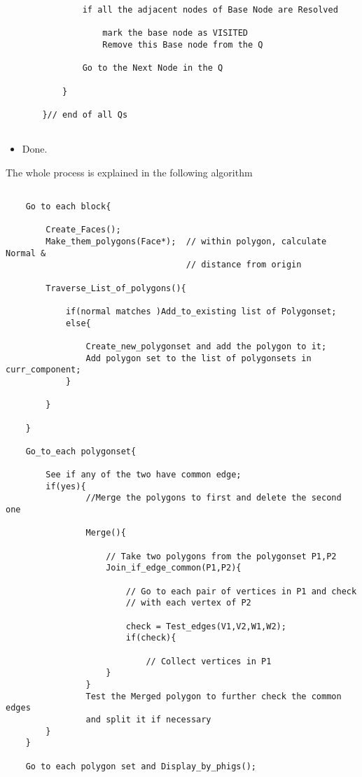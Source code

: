 \begin{itemize}
\begin{verbatim}
            if all the adjacent nodes of Base Node are Resolved
 
                mark the base node as VISITED
                Remove this Base node from the Q
 
            Go to the Next Node in the Q
 
        }
 
    }// end of all Qs
 
    \end{verbatim}
 
    \item
   Done.
 
	\end{itemize}

    The whole process is explained in the following algorithm
 
 
    \begin{verbatim}
 
    Go to each block{
 
        Create_Faces();
        Make_them_polygons(Face*);  // within polygon, calculate Normal &
                                    // distance from origin
 
        Traverse_List_of_polygons(){
 
            if(normal matches )Add_to_existing list of Polygonset;
            else{
 
                Create_new_polygonset and add the polygon to it;
                Add polygon set to the list of polygonsets in curr_component;
            }
 
        }
 
    }
 
    Go_to_each polygonset{
 
        See if any of the two have common edge;
        if(yes){
                //Merge the polygons to first and delete the second one
 
                Merge(){
 
                    // Take two polygons from the polygonset P1,P2
                    Join_if_edge_common(P1,P2){
 
                        // Go to each pair of vertices in P1 and check
                        // with each vertex of P2
 
                        check = Test_edges(V1,V2,W1,W2);
                        if(check){
 
                            // Collect vertices in P1
                    }
                }
                Test the Merged polygon to further check the common edges
                and split it if necessary
        }
    }
 
    Go to each polygon set and Display_by_phigs();
 
    \end{verbatim}

